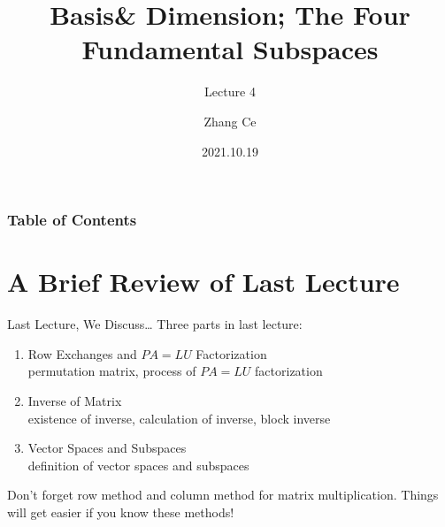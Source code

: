 \documentclass{beamer}
\title[Linear Algebra] %
{Basis\& Dimension; The Four Fundamental Subspaces}
\subtitle{Lecture 4}
\author[11910803@mail.sustech.edu.cn] %
{
    Zhang Ce
}
\institute[] %
{
    Department of Electrical and Electronic Engineering\\
    Southern University of Science and Technology
}
\date[2021.10.19] %
{2021.10.19}
\begin{document}
\frame{\titlepage}


\begin{frame}
\frametitle{Table of Contents}
\tableofcontents
\end{frame}
\section{A Brief Review of Last Lecture}
\begin{frame}{Last Lecture, We Discuss\dots}
Three parts in last lecture:
    \begin{enumerate}
        \item Row Exchanges and $PA=LU$ Factorization\\
        permutation matrix, process of $PA=LU$ factorization
        \item Inverse of Matrix\\
        existence of inverse, calculation of inverse, block inverse
        \item Vector Spaces and Subspaces\\
        definition of vector spaces and subspaces
    \end{enumerate}

Don't forget row method and column method for matrix multiplication. Things will get easier if you know these methods!
\end{frame}
\end{document}

